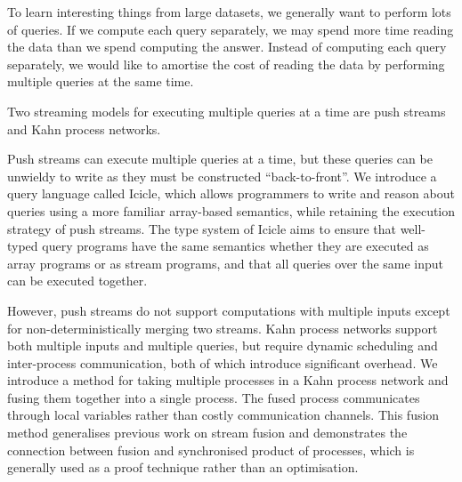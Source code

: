 To learn interesting things from large datasets, we generally want to perform lots of queries.
If we compute each query separately, we may spend more time reading the data than we spend computing the answer.
Instead of computing each query separately, we would like to amortise the cost of reading the data by performing multiple queries at the same time.

Two streaming models for executing multiple queries at a time are push streams and Kahn process networks.

Push streams can execute multiple queries at a time, but these queries can be unwieldy to write as they must be constructed ``back-to-front''.
We introduce a query language called Icicle, which allows programmers to write and reason about queries using a more familiar array-based semantics, while retaining the execution strategy of push streams.
The type system of Icicle aims to ensure that well-typed query programs have the same semantics whether they are executed as array programs or as stream programs, and that all queries over the same input can be executed together.

However, push streams do not support computations with multiple inputs except for non-deterministically merging two streams.
Kahn process networks support both multiple inputs and multiple queries, but require dynamic scheduling and inter-process communication, both of which introduce significant overhead.
We introduce a method for taking multiple processes in a Kahn process network and fusing them together into a single process.
The fused process communicates through local variables rather than costly communication channels.
This fusion method generalises previous work on stream fusion and demonstrates the connection between fusion and synchronised product of processes, which is generally used as a proof technique rather than an optimisation.


